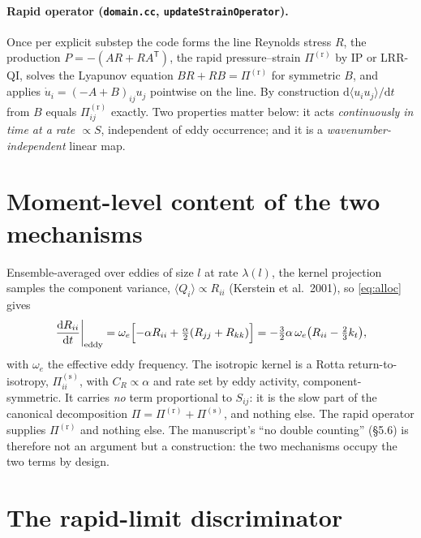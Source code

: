 \documentclass[11pt,a4paper]{article}
\newcommand{\Pir}[1]{\Pi^{(\mathrm r)}_{#1}}
\newcommand{\Pis}[1]{\Pi^{(\mathrm s)}_{#1}}
\newcommand{\kt}{k_t}
\begin{document}
\paragraph{Rapid operator (\texttt{domain.cc}, \texttt{updateStrainOperator}).}
Once per explicit substep the code forms the line Reynolds stress $R$, the
production $P=-(AR+RA^{\mathsf T})$, the rapid pressure--strain $\Pir{}$ by
IP or LRR-QI, solves the Lyapunov equation $BR+RB=\Pir{}$ for symmetric
$B$, and applies $\dot u_i=(-A+B)_{ij}u_j$ pointwise on the line. By
construction $\mathrm d\langle u_iu_j\rangle/\mathrm dt$ from $B$ equals
$\Pir{ij}$ exactly. Two properties matter below: it acts
\emph{continuously in time at a rate $\propto S$}, independent of eddy
occurrence; and it is a \emph{wavenumber-independent} linear map.

\section{Moment-level content of the two mechanisms}

Ensemble-averaged over eddies of size $l$ at rate $\lambda(l)$, the kernel
projection samples the component variance, $\langle Q_i\rangle\propto
R_{ii}$ (Kerstein et al.\ 2001), so \eqref{eq:alloc} gives
\begin{equation}
  \left.\frac{\mathrm dR_{ii}}{\mathrm dt}\right|_{\rm eddy}
  =\omega_e\Bigl[-\alpha R_{ii}+\tfrac{\alpha}{2}(R_{jj}+R_{kk})\Bigr]
  =-\tfrac32\alpha\,\omega_e\bigl(R_{ii}-\tfrac23\kt\bigr),
  \label{eq:rotta}
\end{equation}
with $\omega_e$ the effective eddy frequency. The isotropic kernel is a
Rotta return-to-isotropy, $\Pis{ii}$, with $C_R\propto\alpha$ and rate set
by eddy activity, component-symmetric. It carries \emph{no} term
proportional to $S_{ij}$: it is the slow part of the canonical
decomposition $\Pi=\Pir{}+\Pis{}$, and nothing else. The rapid operator
supplies $\Pir{}$ and nothing else. The manuscript's ``no double
counting'' (\S5.6) is therefore not an argument but a construction: the
two mechanisms occupy the two terms by design.

\section{The rapid-limit discriminator}
\end{document}
